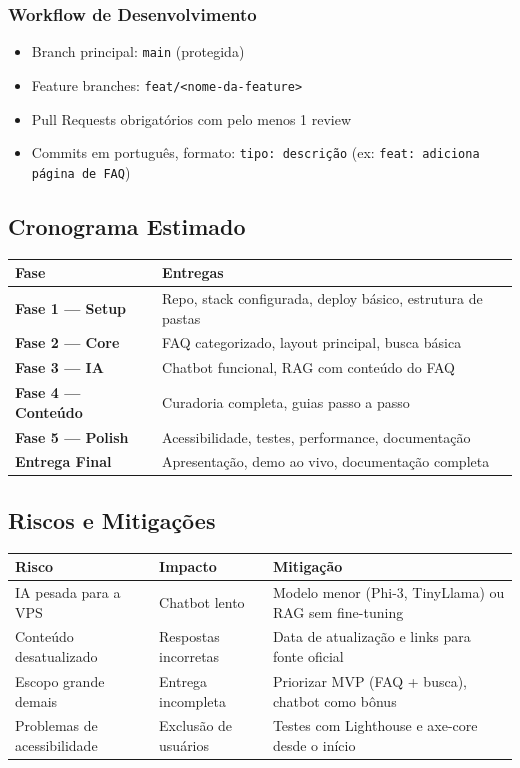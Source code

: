 \documentclass[12pt, a4paper]{article}
\begin{document}
\subsubsection{Workflow de Desenvolvimento}

\begin{itemize}
  \item Branch principal: \texttt{main} (protegida)
  \item Feature branches: \texttt{feat/<nome-da-feature>}
  \item Pull Requests obrigatórios com pelo menos 1 review
  \item Commits em português, formato: \texttt{tipo: descrição} (ex: \texttt{feat: adiciona página de FAQ})
\end{itemize}

\subsection{Cronograma Estimado}

\begin{center}
\begin{tabularx}{\textwidth}{>{\bfseries}l X}
  \toprule
  \rowcolor{unbgreen!10}
  Fase & Entregas \\
  \midrule
  Fase 1 — Setup & Repo, stack configurada, deploy básico, estrutura de pastas \\
  Fase 2 — Core & FAQ categorizado, layout principal, busca básica \\
  Fase 3 — IA & Chatbot funcional, RAG com conteúdo do FAQ \\
  Fase 4 — Conteúdo & Curadoria completa, guias passo a passo \\
  Fase 5 — Polish & Acessibilidade, testes, performance, documentação \\
  Entrega Final & Apresentação, demo ao vivo, documentação completa \\
  \bottomrule
\end{tabularx}
\end{center}

\subsection{Riscos e Mitigações}

\begin{center}
\begin{tabularx}{\textwidth}{l l X}
  \toprule
  \rowcolor{unbgreen!10}
  \textbf{Risco} & \textbf{Impacto} & \textbf{Mitigação} \\
  \midrule
  IA pesada para a VPS & Chatbot lento & Modelo menor (Phi-3, TinyLlama) ou RAG sem fine-tuning \\
  Conteúdo desatualizado & Respostas incorretas & Data de atualização e links para fonte oficial \\
  Escopo grande demais & Entrega incompleta & Priorizar MVP (FAQ + busca), chatbot como bônus \\
  Problemas de acessibilidade & Exclusão de usuários & Testes com Lighthouse e axe-core desde o início \\
  \bottomrule
\end{tabularx}
\end{center}
\end{document}
